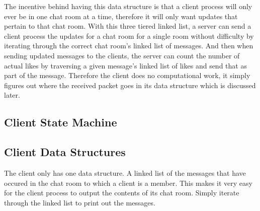 \documentclass[12pt,journal,compsoc]{IEEEtran}
\begin{document}
The incentive behind having this data structure is that a client process will only ever be in one chat room at a time, therefore it will only want updates that pertain to that chat room. With this three tiered linked list, a server can send a client process the updates for a chat room for a single room without difficulty by iterating through the correct chat room's linked list of messages. And then when sending updated messages to the clients, the server can count the number of actual likes by traversing a given message's linked list of likes and send that as part of the message. Therefore the client does no computational work, it simply figures out where the received packet goes in its data structure which is discussed later.

\newpage
\subsection{Client State Machine}

\subsection{Client Data Structures}
The client only has one data structure. A linked list of the messages that have occured in the chat room to which a client is a member. This makes it very easy for the client process to output the contents of its chat room. Simply iterate through the linked list to print out the messages.
\end{document}
